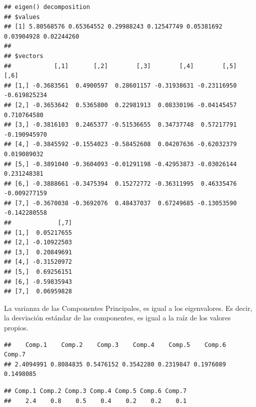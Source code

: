 \documentclass[
]{book}
\newenvironment{Shaded}{\begin{snugshade}}{\end{snugshade}}
\newcommand{\DecValTok}[1]{\textcolor[rgb]{0.00,0.00,0.81}{#1}}
\newcommand{\FunctionTok}[1]{\textcolor[rgb]{0.13,0.29,0.53}{\textbf{#1}}}
\newcommand{\NormalTok}[1]{#1}
\newcommand{\OtherTok}[1]{\textcolor[rgb]{0.56,0.35,0.01}{#1}}
\newcommand{\SpecialCharTok}[1]{\textcolor[rgb]{0.81,0.36,0.00}{\textbf{#1}}}
\begin{document}
\begin{verbatim}
## eigen() decomposition
## $values
## [1] 5.80568576 0.65364552 0.29988243 0.12547749 0.05381692 0.03904928 0.02244260
## 
## $vectors
##            [,1]       [,2]        [,3]        [,4]        [,5]         [,6]
## [1,] -0.3683561  0.4900597  0.28601157 -0.31938631 -0.23116950 -0.619825234
## [2,] -0.3653642  0.5365800  0.22981913  0.08330196 -0.04145457  0.710764580
## [3,] -0.3816103  0.2465377 -0.51536655  0.34737748  0.57217791 -0.190945970
## [4,] -0.3845592 -0.1554023 -0.58452608  0.04207636 -0.62032379  0.019089032
## [5,] -0.3891040 -0.3604093 -0.01291198 -0.42953873 -0.03026144  0.231248381
## [6,] -0.3888661 -0.3475394  0.15272772 -0.36311995  0.46335476 -0.009277159
## [7,] -0.3670038 -0.3692076  0.48437037  0.67249685 -0.13053590 -0.142280558
##             [,7]
## [1,]  0.05217655
## [2,] -0.10922503
## [3,]  0.20849691
## [4,] -0.31520972
## [5,]  0.69256151
## [6,] -0.59835943
## [7,]  0.06959828
\end{verbatim}

La varianza de las Componentes Principales, es igual a los eigenvalores. Es decir, la desviación estándar de las componentes, es igual a la raíz de los valores propios.

\begin{Shaded}
\end{Shaded}

\begin{verbatim}
##    Comp.1    Comp.2    Comp.3    Comp.4    Comp.5    Comp.6    Comp.7 
## 2.4094991 0.8084835 0.5476152 0.3542280 0.2319847 0.1976089 0.1498085
\end{verbatim}

\begin{Shaded}
\end{Shaded}

\begin{verbatim}
## Comp.1 Comp.2 Comp.3 Comp.4 Comp.5 Comp.6 Comp.7 
##    2.4    0.8    0.5    0.4    0.2    0.2    0.1
\end{verbatim}
\end{document}
